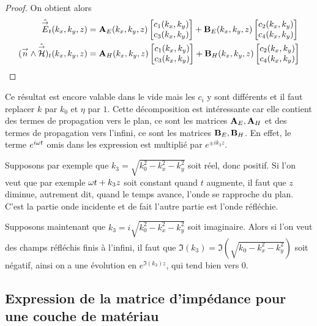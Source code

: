 \begin{proof}
            On obtient alors
            \begin{align}
                \hat{{\overset{\rightarrow}{E}}}_t(k_x,k_y,z) &= \mathbf{A}_E(k_x,k_y,z) \begin{bmatrix}c_1(k_x,k_y) \\ c_3(k_x,k_y)\end{bmatrix} + \mathbf{B}_E(k_x,k_y,z) \begin{bmatrix}c_2(k_x,k_y) \\ c_4(k_x,k_y)\end{bmatrix}
                \\
                ({\overset{\rightarrow}{n}} \wedge \hat{{\overset{\rightarrow}{\mathcal{H}}}})_t(k_x,k_y,z) &= \mathbf{A}_H(k_x,k_y,z) \begin{bmatrix}c_1(k_x,k_y) \\ c_3(k_x,k_y)\end{bmatrix} + \mathbf{B}_H(k_x,k_y,z) \begin{bmatrix}c_2(k_x,k_y) \\ c_4(k_x,k_y)\end{bmatrix}
            \end{align}

        \end{proof}

        Ce résultat est encore valable dans le vide mais les \(c_i\) y sont différents et il faut replacer \(k\) par \(k_0\) et \(\eta\) par \(1\).
        Cette décomposition est intéressante car elle contient des termes de propagation vers le plan, ce sont les matrices \(\mathbf{A}_E, \mathbf{A}_H\) et des termes de propagation vers l'infini, ce sont les matrices \(\mathbf{B}_E, \mathbf{B}_H\). En effet, le terme \(e^{i\omega t}\) omis dans les expression est multiplié par \(e^{\pm i k_3 z}\). 

        Supposons par exemple que \(k_3 = \sqrt{k_0^2 - k_x^2 - k_y^2}\) soit réel, donc positif. Si l'on veut que par exemple \(\omega t + k_3 z\) soit constant quand \(t\) augmente, il faut que \(z\) diminue, autrement dit, quand le temps avance, l'onde se rapproche du plan. C'est la partie onde incidente et de fait l'autre partie est l'onde réfléchie.

        Supposons maintenant que \(k_3 = i\sqrt{k_0^2 - k_x^2 - k_y^2}\)  soit imaginaire. Alors si l'on veut des champs réfléchis finis à l'infini, il faut que \(\Im(k_3) = \Im(\sqrt{k_0 - k_x^2 - k_y^2})\) soit négatif, ainsi on a une évolution en \(e^{\Im(k_3)z}\), qui tend bien vers \(0\).

    \subsection{Expression de la matrice d'impédance pour une couche de matériau}

